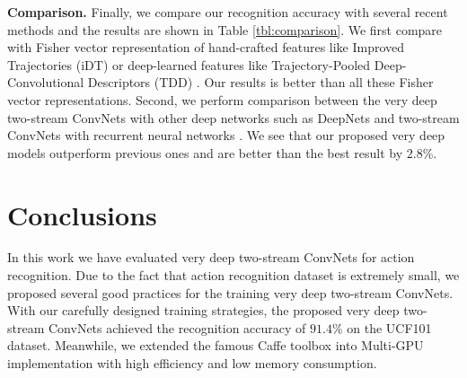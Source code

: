 \documentclass[10pt,twocolumn,letterpaper]{article}
\begin{document}
{\bf Comparison.} Finally, we compare our recognition accuracy with several recent methods and the results are shown in Table \ref{tbl:comparison}. We first compare with Fisher vector representation of hand-crafted features like Improved Trajectories (iDT) \cite{WangS13a} or deep-learned features like Trajectory-Pooled Deep-Convolutional Descriptors (TDD) \cite{WangQT15a}. Our results is better than all these Fisher vector representations. Second, we perform comparison between the very deep two-stream ConvNets with other deep networks such as DeepNets \cite{KarpathyTSLSF14} and two-stream ConvNets with recurrent neural networks \cite{Ng15}. We see that our proposed very deep models outperform previous ones and are better than the best result by $2.8\%$.

\section{Conclusions}
\label{sec:conclusion}

In this work we have evaluated very deep two-stream ConvNets for action recognition. Due to the fact that action recognition dataset is extremely small, we proposed several good practices for the training very deep two-stream ConvNets. With our carefully designed training strategies, the proposed very deep two-stream ConvNets achieved the recognition accuracy of $91.4\%$ on the UCF101 dataset. Meanwhile, we extended the famous Caffe toolbox into Multi-GPU implementation with high efficiency and low memory consumption.

{


}
\end{document}
